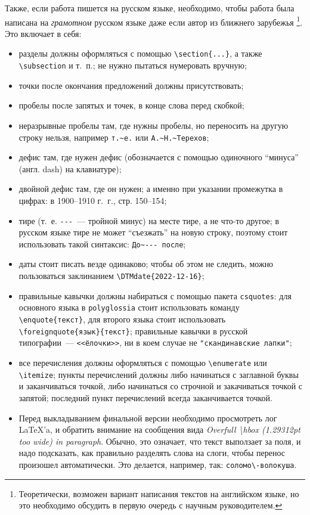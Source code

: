 Также, если работа пишется на русском языке, необходимо, чтобы работа была написана на \textit{грамотном} русском языке даже если автор из ближнего зарубежья%
\footnote{Теоретически, возможен вариант написания текстов на английском языке, но это необходимо обсудить в первую очередь с научным руководителем.}.
Это включает в себя:
\begin{itemize}
    \item разделы должны оформляться с помощью \verb=\section{...}=, а также \verb=\subsection= и т.~п.; не нужно пытаться нумеровать вручную;
    \item точки после окончания предложений должны присутствовать;
    \item пробелы после запятых и точек, в конце слова перед скобкой;
    \item неразрывные пробелы там, где нужны пробелы, но переносить на другую строку нельзя, например \verb=т.~е.= или \verb=А.~Н.~Терехов=;
    \item дефис там, где нужен дефис (обозначается с помощью одиночного \enquote{минуса} (англ. dash) на клавиатуре);
    \item двойной дефис там, где он нужен; а именно  при указании проме\-жутка в цифрах: в 1900--1910 г.~г., стр. 150--154;
    \item тире (т.~е. \verb=---=~--- тройной минус) на месте тире, а не что-то другое; в русском языке тире не может \enquote{съезжать} на новую строку, поэтому стоит использовать такой синтаксис: \verb=До~--- после=;
    \item даты стоит писать везде одинаково; чтобы об этом не следить, можно пользоваться заклинанием \verb=\DTMdate{2022-12-16}=;
    \item правильные кавычки должны набираться с помощью пакета \texttt{csquotes}: для основного языка в \texttt{polyglossia} стоит использовать команду \verb=\enquote{текст}=, для второго языка стоит использовать \verb=\foreignquote{язык}{текст}=; правильные кавычки в русской типографии~--- \verb=<<ёлочки>>=, ни в коем случае не \verb="скандинавские лапки"=;
    \item все перечисления должны оформляться с помощью \verb=\enumerate= или \verb=\itemize=; пункты перечислений должны либо начинаться с заглавной буквы и заканчиваться точкой, либо начинаться со строчной и закачиваться точкой с запятой; последний пункт пере\-числений всегда заканчивается точкой.
    \item Перед выкладыванием финальной версии необходимо просмотреть лог \LaTeX'a, и обратить внимание на сообщения вида \emph{Overfull \textbackslash hbox (1.29312pt too wide) in paragraph}. Обычно, это означает, что текст выползает за поля, и надо подсказать, как правильно разделять слова на слоги, чтобы перенос произошел автоматически.
          Это делается, например, так: \verb=соломо\-волокуша=.
\end{itemize}

